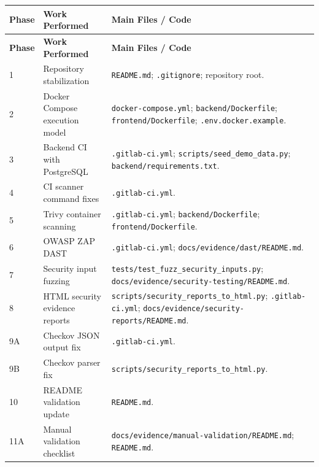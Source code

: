 \documentclass[12pt,a4paper]{report}
\begin{document}
\begin{longtable}{|p{1.5cm}|p{4.8cm}|p{9.8cm}|}
\hline
\textbf{Phase} & \textbf{Work Performed} & \textbf{Main Files / Code} \\
\hline
\endfirsthead

\hline
\textbf{Phase} & \textbf{Work Performed} & \textbf{Main Files / Code} \\
\hline
\endhead

1 & Repository stabilization &
\texttt{README.md}; \texttt{.gitignore}; repository root. \\
\hline

2 & Docker Compose execution model &
\texttt{docker-compose.yml}; \texttt{backend/Dockerfile}; \texttt{frontend/Dockerfile}; \texttt{.env.docker.example}. \\
\hline

3 & Backend CI with PostgreSQL &
\texttt{.gitlab-ci.yml}; \texttt{scripts/seed\_demo\_data.py}; \texttt{backend/requirements.txt}. \\
\hline

4 & CI scanner command fixes &
\texttt{.gitlab-ci.yml}. \\
\hline

5 & Trivy container scanning &
\texttt{.gitlab-ci.yml}; \texttt{backend/Dockerfile}; \texttt{frontend/Dockerfile}. \\
\hline

6 & OWASP ZAP DAST &
\texttt{.gitlab-ci.yml}; \texttt{docs/evidence/dast/README.md}. \\
\hline

7 & Security input fuzzing &
\texttt{tests/test\_fuzz\_security\_inputs.py};
\texttt{docs/evidence/security-testing/README.md}. \\
\hline

8 & HTML security evidence reports &
\texttt{scripts/security\_reports\_to\_html.py}; \texttt{.gitlab-ci.yml}; \texttt{docs/evidence/security-reports/README.md}. \\
\hline

9A & Checkov JSON output fix &
\texttt{.gitlab-ci.yml}. \\
\hline

9B & Checkov parser fix &
\texttt{scripts/security\_reports\_to\_html.py}. \\
\hline

10 & README validation update &
\texttt{README.md}. \\
\hline

11A & Manual validation checklist &
\texttt{docs/evidence/manual-validation/README.md}; \texttt{README.md}. \\
\hline


\end{longtable}
\end{document}

